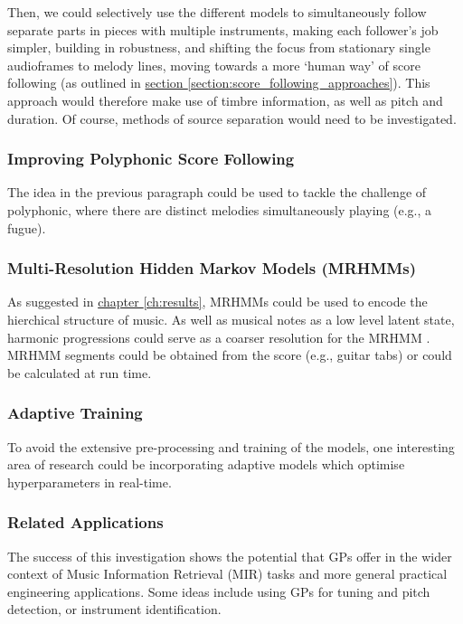 Then, we could selectively use the different models to simultaneously follow separate parts in pieces with multiple instruments, making each follower’s job simpler, building in robustness, and shifting the focus from stationary single audioframes to melody lines, moving towards a more `human way' of score following (as outlined in \hyperref[section:score_following_approaches]{section \ref*{section:score_following_approaches}}). This approach would therefore make use of \gls{timbre} information, as well as pitch and duration. Of course, methods of source separation would need to be investigated.

\subsubsection{Improving Polyphonic Score Following}
The idea in the previous paragraph could be used to tackle the challenge of \gls{polyphonic}, where there are distinct melodies simultaneously playing (e.g., a fugue).   

\subsubsection{Multi-Resolution Hidden Markov Models (MRHMMs)}
As suggested in \hyperref[ch:results]{chapter \ref*{ch:results}}, MRHMMs could be used to encode the hierchical structure of music. As well as musical notes as a low level latent state, \gls{harmonic progression}s could serve as a coarser resolution for the MRHMM \cite{Baggenstoss}. MRHMM segments could be obtained from the score (e.g., guitar tabs) or could be calculated at run time.

\subsubsection{Adaptive Training}
To avoid the extensive pre-processing and training of the models, one interesting area of research could be incorporating adaptive models which optimise hyperparameters in real-time. 

\subsubsection{Related Applications}
The success of this investigation shows the potential that GPs offer in the wider context of Music Information Retrieval (MIR) tasks and more general practical engineering applications. Some ideas include using GPs for tuning and pitch detection, or instrument identification.

